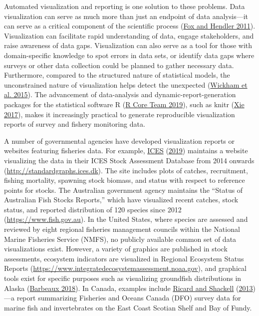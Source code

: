\documentclass[12pt,]{article}
\begin{document}
Automated visualization and reporting is one solution to these problems. Data visualization can serve as much more than just an endpoint of data analysis---it can serve as a critical component of the scientific process (\protect\hyperlink{ref-fox2011}{Fox and Hendler 2011}). Visualization can facilitate rapid understanding of data, engage stakeholders, and raise awareness of data gaps. Visualization can also serve as a tool for those with domain-specific knowledge to spot errors in data sets, or identify data gaps where surveys or other data collection could be planned to gather necessary data. Furthermore, compared to the structured nature of statistical models, the unconstrained nature of visualization helps detect the unexpected (\protect\hyperlink{ref-wickham2015}{Wickham et al. 2015}). The advancement of data-analysis and dynamic-report-generation packages for the statistical software R (\protect\hyperlink{ref-r2019}{R Core Team 2019}), such as knitr (\protect\hyperlink{ref-xie2017}{Xie 2017}), makes it increasingly practical to generate reproducible visualization reports of survey and fishery monitoring data.

A number of governmental agencies have developed visualization reports or websites featuring fisheries data.
For example, \protect\hyperlink{ref-ices2019}{ICES} (\protect\hyperlink{ref-ices2019}{2019}) maintains a website visualizing the data in their ICES Stock Assessment Database from 2014 onwards (\url{http://standardgraphs.ices.dk}).
The site includes plots of catches, recruitment, fishing mortality, spawning stock biomass, and status with respect to reference points for stocks.
The Australian government agency maintains the ``Status of Australian Fish Stocks Reports,'' which have visualized recent catches, stock status, and reported distribution of 120 species since 2012 (\url{https://www.fish.gov.au}).
In the United States, where species are assessed and reviewed by eight regional fisheries management councils within the National Marine Fisheries Service (NMFS), no publicly available common set of data visualizations exist.
However, a variety of graphics are published in stock assessments, ecosystem indicators are visualized in Regional Ecosystem Status Reports (\url{https://www.integratedecosystemassessment.noaa.gov}), and graphical tools exist for specific purposes such as visualizing groundfish distributions in Alaska (\protect\hyperlink{ref-barbeaux2018}{Barbeaux 2018}).
In Canada, examples include \protect\hyperlink{ref-ricard2013}{Ricard and Shackell} (\protect\hyperlink{ref-ricard2013}{2013})---a report summarizing Fisheries and Oceans Canada (DFO) survey data for marine fish and invertebrates on the East Coast Scotian Shelf and Bay of Fundy.
\end{document}
